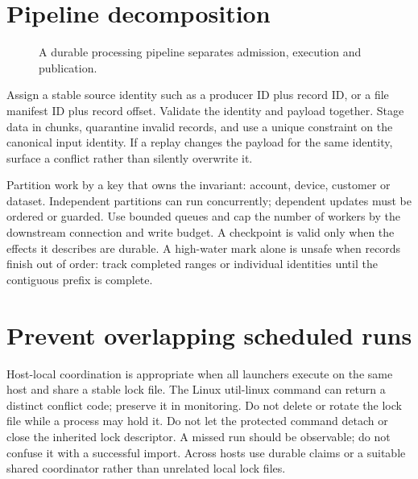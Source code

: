 \section{Pipeline decomposition}
\begin{figure}[!htbp]\centering
{}
\caption{A durable processing pipeline separates admission, execution and publication.}
\end{figure}
Assign a stable source identity such as a producer ID plus record ID, or
a file manifest ID plus record offset. Validate the identity and payload
together. Stage data in chunks, quarantine invalid records, and use a unique
constraint on the canonical input identity. If a replay changes the payload
for the same identity, surface a conflict rather than silently overwrite it.

Partition work by a key that owns the invariant: account, device, customer
or dataset. Independent partitions can run concurrently; dependent updates
must be ordered or guarded. Use bounded queues and cap the number of workers
by the downstream connection and write budget. A checkpoint is valid only
when the effects it describes are durable. A high-water mark alone is
unsafe when records finish out of order: track completed ranges or individual
identities until the contiguous prefix is complete.

\section{Prevent overlapping scheduled runs}
Host-local coordination is appropriate when all launchers execute on the
same host and share a stable lock file. The Linux util-linux 
command can return a distinct conflict code; preserve it in monitoring.
Do not delete or rotate the lock file while a process may hold it.
Do not let the protected command detach or close the inherited lock
descriptor. A missed run should be observable; do not confuse it with a
successful import. Across hosts use durable claims or a suitable shared
coordinator rather than unrelated local lock files.


